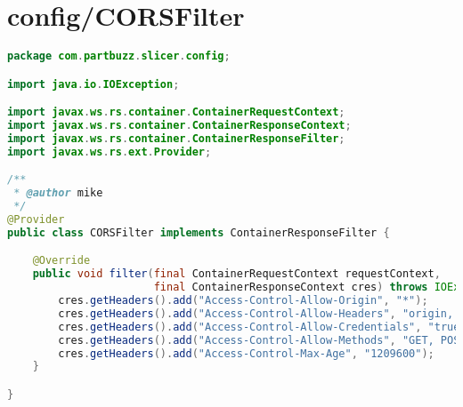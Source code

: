 \section{config/CORSFilter}
\begin{lstlisting}[language=Java, label={lst:CORSFilter}, caption=As CuraEngine allows cross origin responses a filter is requred to allow access by default in WildFly.]
package com.partbuzz.slicer.config;

import java.io.IOException;

import javax.ws.rs.container.ContainerRequestContext;
import javax.ws.rs.container.ContainerResponseContext;
import javax.ws.rs.container.ContainerResponseFilter;
import javax.ws.rs.ext.Provider;

/**
 * @author mike
 */
@Provider
public class CORSFilter implements ContainerResponseFilter {

    @Override
    public void filter(final ContainerRequestContext requestContext,
                       final ContainerResponseContext cres) throws IOException {
        cres.getHeaders().add("Access-Control-Allow-Origin", "*");
        cres.getHeaders().add("Access-Control-Allow-Headers", "origin, content-type, accept, authorization");
        cres.getHeaders().add("Access-Control-Allow-Credentials", "true");
        cres.getHeaders().add("Access-Control-Allow-Methods", "GET, POST, PUT, DELETE, OPTIONS, HEAD");
        cres.getHeaders().add("Access-Control-Max-Age", "1209600");
    }

}
\end{lstlisting}


